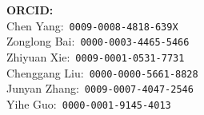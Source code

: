 \documentclass[12pt]{article}
\begin{document}
	\vspace{1em}
	
	\begin{flushleft}
		\textbf{ORCID:}\\
		Chen Yang:~\texttt{0009-0008-4818-639X}\\
		Zonglong Bai:~\texttt{0000-0003-4465-5466}\\
		Zhiyuan Xie:~\texttt{0009-0001-0531-7731}\\
		Chenggang Liu:~\texttt{0000-0000-5661-8828}\\
		Junyan Zhang:~\texttt{0009-0007-4047-2546}\\
		Yihe Guo:~\texttt{0000-0001-9145-4013}
	\end{flushleft}
	
	
	
	
	
	
	
\end{document}
